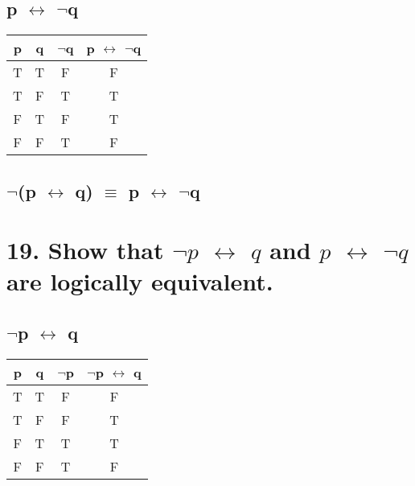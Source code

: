 \documentclass[11pt, oneside]{article} %
\numberwithin{equation}{section} %
\numberwithin{figure}{section} %
\begin{document}
\begin{table}[!htp]
\subsection{p $\leftrightarrow$ $\neg$q}
\begin{tabular}{c c c c}
\hline\hline
p & q & $\neg$q & p $\leftrightarrow$ $\neg$q \\ [0.5ex] %
\hline
T & T & F & F\\
T & F & T & T\\
F & T & F & T\\
F & F & T & F\\ [1ex]
\hline
\end{tabular}
\label{table:nonlin}
\subsection{$\neg$(p $\leftrightarrow$ q) $\equiv$ p $\leftrightarrow$ $\neg$q}
\end{table}


\begin{table}[!htp]
\section{19. Show that $\neg$$p$ $\leftrightarrow$ $q$ and $p$ $\leftrightarrow$ $\neg$$q$ are logically equivalent.}
\subsection{$\neg$p $\leftrightarrow$ q}
\begin{tabular}{c c c c}
\hline\hline
p & q & $\neg$p & $\neg$p $\leftrightarrow$ q \\ [0.5ex] %
\hline
T & T & F & F\\
T & F & F & T\\
F & T & T & T\\
F & F & T & F\\ [1ex]
\hline
\end{tabular}
\label{table:nonlin}
\end{table}
\end{document}
